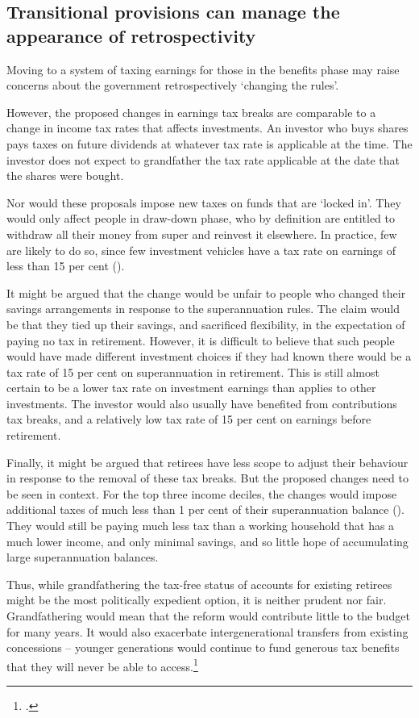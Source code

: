 \documentclass{grattanAlpha}
\begin{document}
\subsection{Transitional provisions can manage the appearance of retrospectivity}\label{sec:SUPER-6-5}
Moving to a system of taxing earnings for those in the benefits phase may raise concerns about the government retrospectively ‘changing the rules’. 

However, the proposed changes in earnings tax breaks are comparable to a change in income tax rates that affects investments. An investor who buys shares pays taxes on future dividends at whatever tax rate is applicable at the time. The investor does not expect to grandfather the tax rate applicable at the date that the shares were bought. 

Nor would these proposals impose new taxes on funds that are ‘locked in’. They would only affect people in draw-down phase, who by definition are entitled to withdraw all their money from super and reinvest it elsewhere. In practice, few are likely to do so, since few investment vehicles have a tax rate on earnings of less than 15 per cent ().

It might be argued that the change would be unfair to people who changed their savings arrangements in response to the superannuation rules. The claim would be that they tied up their savings, and sacrificed flexibility, in the expectation of paying no tax in retirement. However, it is difficult to believe that such people would have made different investment choices if they had known there would be a tax rate of 15 per cent on superannuation in retirement. This is still almost certain to be a lower tax rate on investment earnings than applies to other investments. The investor would also usually have benefited from contributions tax breaks, and a relatively low tax rate of 15 per cent on earnings before retirement.

Finally, it might be argued that retirees have less scope to adjust their behaviour in response to the removal of these tax breaks. But the proposed changes need to be seen in context. For the top three income deciles, the changes would impose additional taxes of much less than 1 per cent of their superannuation balance (). They would still be paying much less tax than a working household that has a much lower income, and only minimal savings, and so little hope of accumulating large superannuation balances. 

Thus, while grandfathering the tax-free status of accounts for existing retirees might be the most politically expedient option, it is neither prudent nor fair. Grandfathering would mean that the reform would contribute little to the budget for many years. It would also exacerbate intergenerational transfers from existing concessions – younger generations would continue to fund generous tax benefits that they will never be able to access.\footcite[][47]{DaleyWoodWeidmannEtAl2014}  
\end{document}

